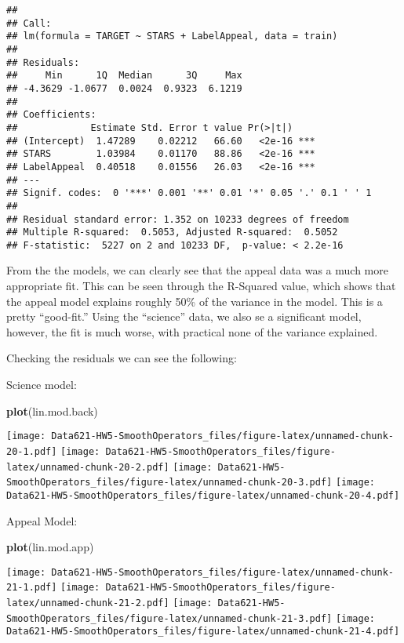 \documentclass[]{article}
\newenvironment{Shaded}{\begin{snugshade}}{\end{snugshade}}
\newcommand{\KeywordTok}[1]{\textcolor[rgb]{0.13,0.29,0.53}{\textbf{{#1}}}}
\newcommand{\NormalTok}[1]{{#1}}
\begin{document}
\begin{verbatim}
## 
## Call:
## lm(formula = TARGET ~ STARS + LabelAppeal, data = train)
## 
## Residuals:
##     Min      1Q  Median      3Q     Max 
## -4.3629 -1.0677  0.0024  0.9323  6.1219 
## 
## Coefficients:
##             Estimate Std. Error t value Pr(>|t|)    
## (Intercept)  1.47289    0.02212   66.60   <2e-16 ***
## STARS        1.03984    0.01170   88.86   <2e-16 ***
## LabelAppeal  0.40518    0.01556   26.03   <2e-16 ***
## ---
## Signif. codes:  0 '***' 0.001 '**' 0.01 '*' 0.05 '.' 0.1 ' ' 1
## 
## Residual standard error: 1.352 on 10233 degrees of freedom
## Multiple R-squared:  0.5053, Adjusted R-squared:  0.5052 
## F-statistic:  5227 on 2 and 10233 DF,  p-value: < 2.2e-16
\end{verbatim}

From the the models, we can clearly see that the appeal data was a much
more appropriate fit. This can be seen through the R-Squared value,
which shows that the appeal model explains roughly 50\% of the variance
in the model. This is a pretty ``good-fit.'' Using the ``science'' data,
we also se a significant model, however, the fit is much worse, with
practical none of the variance explained.

Checking the residuals we can see the following:

Science model:

\begin{Shaded}
\begin{Highlighting}[]
\KeywordTok{plot}\NormalTok{(lin.mod.back)}
\end{Highlighting}
\end{Shaded}

\texttt{[image: Data621-HW5-SmoothOperators\_files/figure-latex/unnamed-chunk-20-1.pdf]}
\texttt{[image: Data621-HW5-SmoothOperators\_files/figure-latex/unnamed-chunk-20-2.pdf]}
\texttt{[image: Data621-HW5-SmoothOperators\_files/figure-latex/unnamed-chunk-20-3.pdf]}
\texttt{[image: Data621-HW5-SmoothOperators\_files/figure-latex/unnamed-chunk-20-4.pdf]}

Appeal Model:

\begin{Shaded}
\begin{Highlighting}[]
\KeywordTok{plot}\NormalTok{(lin.mod.app)}
\end{Highlighting}
\end{Shaded}

\texttt{[image: Data621-HW5-SmoothOperators\_files/figure-latex/unnamed-chunk-21-1.pdf]}
\texttt{[image: Data621-HW5-SmoothOperators\_files/figure-latex/unnamed-chunk-21-2.pdf]}
\texttt{[image: Data621-HW5-SmoothOperators\_files/figure-latex/unnamed-chunk-21-3.pdf]}
\texttt{[image: Data621-HW5-SmoothOperators\_files/figure-latex/unnamed-chunk-21-4.pdf]}
\end{document}
